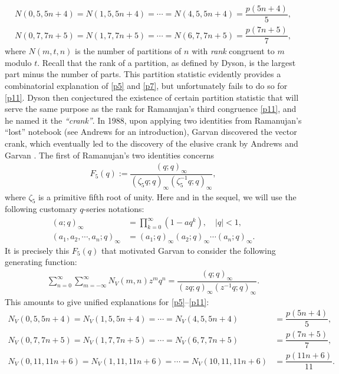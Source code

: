 \documentclass[12pt]{amsart}
\numberwithin{equation}{section}
\theoremstyle{plain}
\theoremstyle{definition}
\begin{document}
\begin{align*}
N(0,5,5n+4)=N(1,5,5n+4)=\cdots=N(4,5,5n+4)=\dfrac{p(5n+4)}{5},\\
N(0,7,7n+5)=N(1,7,7n+5)=\cdots=N(6,7,7n+5)=\dfrac{p(7n+5)}{7},
\end{align*}
where $N(m,t,n)$ is the number of partitions of $n$ with \emph{rank} congruent to $m$ modulo $t$. Recall that the rank of a partition, as defined by Dyson, is the largest part minus the number of parts. This partition statistic evidently provides a combinatorial explanation of \eqref{p5} and \eqref{p7}, but unfortunately fails to do so for \eqref{p11}. Dyson \cite{Dys} then conjectured the existence of certain partition statistic that will serve the same purpose as the rank for Ramanujan's third congruence \eqref{p11}, and he named it the \emph{``crank''}. In 1988, upon applying two identities from Ramanujan's ``lost'' notebook (see Andrews \cite{And} for an introduction), Garvan \cite{Gar} discovered the vector crank, which eventually led to the discovery of the elusive crank by Andrews and Garvan \cite{AG1}. The first of Ramanujan's two identities concerns
\begin{align*}
F_5(q):=\dfrac{(q;q)_{\infty}}{(\zeta_5q;q)_{\infty}(\zeta_5^{-1}q;q)_{\infty}},
\end{align*}
where $\zeta_5$ is a primitive fifth root of unity. Here and in the sequel, we will use the following customary $q$-series notations:
\begin{align*}
(a;q)_{\infty} &=\prod_{k=0}^{\infty}(1-aq^{k}),\quad |q|<1,\\
(a_{1},a_{2},\cdots,a_{n};q)_{\infty}&=(a_{1};q)_{\infty}(a_{2};q)_{\infty}\cdots(a_{n};q)_{\infty}.
\end{align*}
It is precisely this $F_5(q)$ that motivated Garvan to consider the following generating function:
\begin{align*}
\sum_{n=0}^{\infty}\sum_{m=-\infty}^{\infty}N_{V}(m,n)z^{m}q^{n}=\dfrac{(q;q)_{\infty}}{(zq;q)_{\infty}(z^{-1}q;q)_{\infty}}.
\end{align*}
This amounts to give unified explanations for \eqref{p5}--\eqref{p11}:
\begin{align}
\label{NV5}N_V(0,5,5n+4)=N_V(1,5,5n+4)=\cdots=N_V(4,5,5n+4) &=\dfrac{p(5n+4)}{5},\\
\label{NV7}N_V(0,7,7n+5)=N_V(1,7,7n+5)=\cdots=N_V(6,7,7n+5) &=\dfrac{p(7n+5)}{7},\\
\label{NV11}N_V(0,11,11n+6)=N_V(1,11,11n+6)=\cdots=N_V(10,11,11n+6) &=\dfrac{p(11n+6)}{11}.
\end{align}
\end{document}
